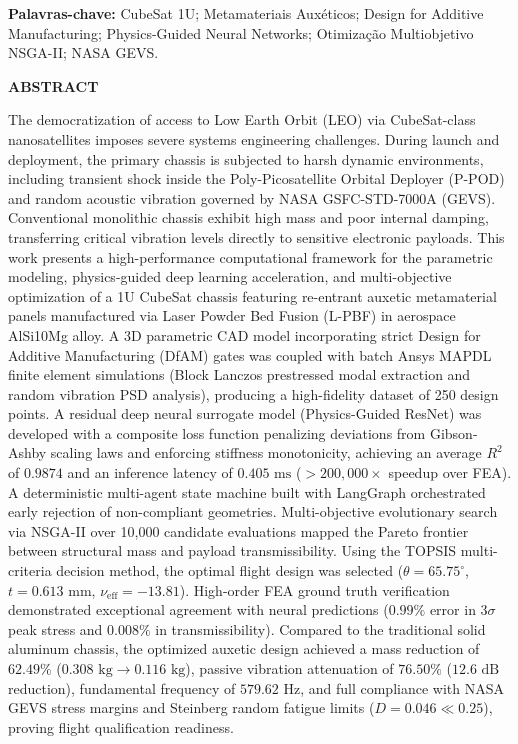 \documentclass[12pt,a4paper]{report}
\begin{document}
\vspace{0.5cm}
\noindent \textbf{Palavras-chave:} CubeSat 1U; Metamateriais Auxéticos; Design for Additive Manufacturing; Physics-Guided Neural Networks; Otimização Multiobjetivo NSGA-II; NASA GEVS.

\clearpage
\begin{center}
    {\textbf{\Large ABSTRACT}}
\end{center}
\vspace{0.5cm}

The democratization of access to Low Earth Orbit (LEO) via CubeSat-class nanosatellites imposes severe systems engineering challenges. During launch and deployment, the primary chassis is subjected to harsh dynamic environments, including transient shock inside the Poly-Picosatellite Orbital Deployer (P-POD) and random acoustic vibration governed by NASA GSFC-STD-7000A (GEVS). Conventional monolithic chassis exhibit high mass and poor internal damping, transferring critical vibration levels directly to sensitive electronic payloads. This work presents a high-performance computational framework for the parametric modeling, physics-guided deep learning acceleration, and multi-objective optimization of a 1U CubeSat chassis featuring re-entrant auxetic metamaterial panels manufactured via Laser Powder Bed Fusion (L-PBF) in aerospace AlSi10Mg alloy. A 3D parametric CAD model incorporating strict Design for Additive Manufacturing (DfAM) gates was coupled with batch Ansys MAPDL finite element simulations (Block Lanczos prestressed modal extraction and random vibration PSD analysis), producing a high-fidelity dataset of 250 design points. A residual deep neural surrogate model (Physics-Guided ResNet) was developed with a composite loss function penalizing deviations from Gibson-Ashby scaling laws and enforcing stiffness monotonicity, achieving an average $R^2$ of $0.9874$ and an inference latency of $0.405\text{ ms}$ ($> 200,000\times$ speedup over FEA). A deterministic multi-agent state machine built with LangGraph orchestrated early rejection of non-compliant geometries. Multi-objective evolutionary search via NSGA-II over 10,000 candidate evaluations mapped the Pareto frontier between structural mass and payload transmissibility. Using the TOPSIS multi-criteria decision method, the optimal flight design was selected ($\theta = 65.75^\circ$, $t = 0.613\text{ mm}$, $\nu_{\text{eff}} = -13.81$). High-order FEA ground truth verification demonstrated exceptional agreement with neural predictions ($0.99\%$ error in $3\sigma$ peak stress and $0.008\%$ in transmissibility). Compared to the traditional solid aluminum chassis, the optimized auxetic design achieved a mass reduction of $62.49\%$ ($0.308\text{ kg} \to 0.116\text{ kg}$), passive vibration attenuation of $76.50\%$ ($12.6\text{ dB}$ reduction), fundamental frequency of $579.62\text{ Hz}$, and full compliance with NASA GEVS stress margins and Steinberg random fatigue limits ($D = 0.046 \ll 0.25$), proving flight qualification readiness.
\end{document}
